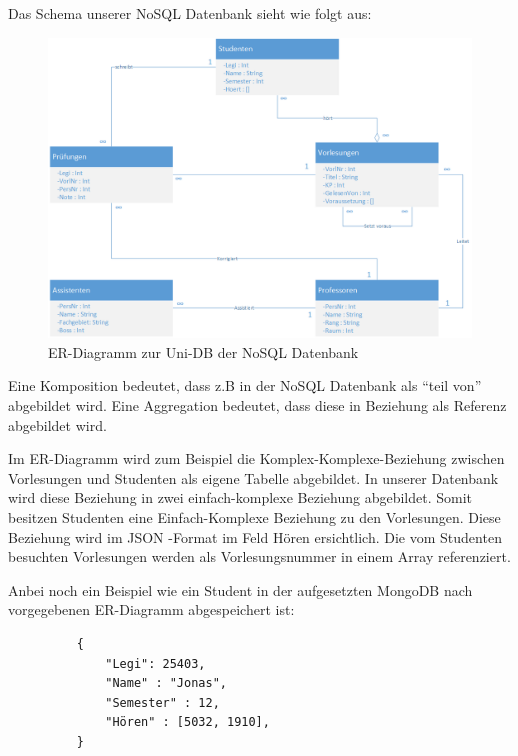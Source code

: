 \newpage
Das Schema unserer NoSQL Datenbank sieht wie folgt aus:
\begin{figure}[h] 
	\centering
		\includegraphics[width=1\textwidth]{./pictures/NoSQL-DB_ER_Diagramm_UNI-DB.png}
	\caption{ER-Diagramm zur Uni-DB der NoSQL Datenbank}
	\label{fig:uni-dbNoSQL}
\end{figure}

Eine Komposition bedeutet, dass z.B in der NoSQL Datenbank als ``teil von''
abgebildet wird. Eine Aggregation bedeutet, dass diese in Beziehung  als
Referenz abgebildet wird.

Im ER-Diagramm wird zum Beispiel die Komplex-Komplexe-Beziehung zwischen 
Vorlesungen und Studenten als eigene Tabelle abgebildet. In unserer Datenbank
wird diese Beziehung in zwei einfach-komplexe Beziehung abgebildet. Somit
besitzen Studenten eine Einfach-Komplexe Beziehung zu den Vorlesungen.
Diese Beziehung wird im JSON -Format im Feld Hören ersichtlich. Die vom
Studenten besuchten Vorlesungen werden als Vorlesungsnummer in einem Array
referenziert.

\newpage
\noindent
Anbei noch ein Beispiel wie ein Student in der aufgesetzten MongoDB nach vorgegebenen ER-Diagramm abgespeichert ist:
\begin{figure} [h]
	\begin{verbatim}
	{
		"Legi": 25403,
		"Name" : "Jonas",
		"Semester" : 12,
		"Hören" : [5032, 1910],
	}
	\end{verbatim}
	\label{cod:vorlesung}
\end{figure}



